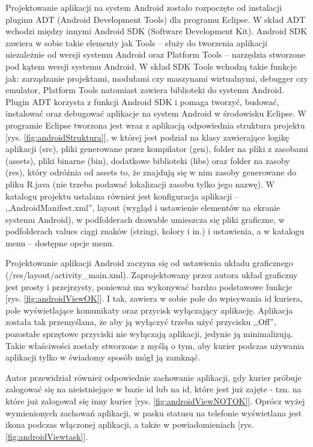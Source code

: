 \documentclass[eng,printmode,oneside]{mgr}
\begin{document}
Projektowanie aplikacji na system Android zostało rozpoczęte od instalacji
pluginu ADT (Android Development Tools) dla programu Eclipse. W skład ADT
wchodzi między innymi Android SDK (Software Development Kit).
Android SDK zawiera w sobie takie elementy jak Tools -- służy do tworzenia aplikacji niezależnie od
wersji systemu Android oraz Platform Tools -- narzędzia stworzone pod kątem
wersji systemu Android. W skład SDK Tools wchodzą takie funkcje jak: zarządzanie
projektami, modułami czy maszynami wirtualnymi, debugger czy emulator,
Platform Tools natomiast zawiera biblioteki do systemu Android. Plugin ADT 
korzysta z funkcji Android SDK i pomaga tworzyć, budować, instalować oraz debugować
aplikacje na system Android w środowisku Eclipse. W programie Eclipse tworzona
jest wraz z aplikacją odpowiednia struktura projektu [rys. \ref{fig:androidStruktura}], w
której jest podział na klasy zawierające logikę aplikacji (src), pliki
generowane przez kompilator (gen), folder na pliki z zasobami (assets), pliki
binarne (bin), dodatkowe biblioteki (libs) oraz folder na zasoby (res), który
odróżnia od assets to, że znajdują się w nim zasoby generowane do pliku R.java
(nie trzeba podawać lokalizacji zasobu tylko jego nazwę). W katalogu projektu
ustalana również jest konfiguracja aplikacji -- ,,AndroidManifest.xml'', layout
(wygląd i ustawienie elementów na ekranie systemu Android), w podfolderach
drawable umieszcza się pliki graficzne, w podfolderach values ciągi znaków
(stringi, kolory i in.) i ustawienia, a w katalogu menu -- dostępne opcje menu.

Projektowanie aplikacji Android zaczyna się od ustawienia układu graficznego
(/res/layout/activity\_main.xml). Zaprojektowany przez autora układ graficzny jest
prosty i przejrzysty, ponieważ ma wykonywać bardzo podstawowe funkcje [rys.
\ref{fig:androidViewOK}]. I tak, zawiera w sobie pole do wpisywania id kuriera,
pole wyświetlające komunikaty oraz przycisk wyłączający aplikację. Aplikacja została
tak przemyślana, że aby ją wyłączyć trzeba użyć przycisku ,,Off'', pozostałe
sprzętowe przyciski nie wyłączają aplikacji, jedynie ją minimalizują. Takie
właściwości zostały stworzone z myślą o tym, aby kurier podczas używania aplikacji tylko w świadomy
sposób mógł ją zamknąć.

Autor przewidział również odpowiednie zachowanie aplikacji, gdy kurier próbuje
zalogować się na nieistniejące w bazie id lub na id, które jest już zajęte -
tzn. na które już zalogował się inny kurier [rys. \ref{fig:androidViewNOTOK}]. 
Oprócz wyżej wymienionych zachowań aplikacji, w pasku statusu na telefonie
wyświetlana jest ikona podczas włączonej aplikacji, a także w
powiadomieniach [rys. \ref{fig:androidViewtask}].
\end{document}
